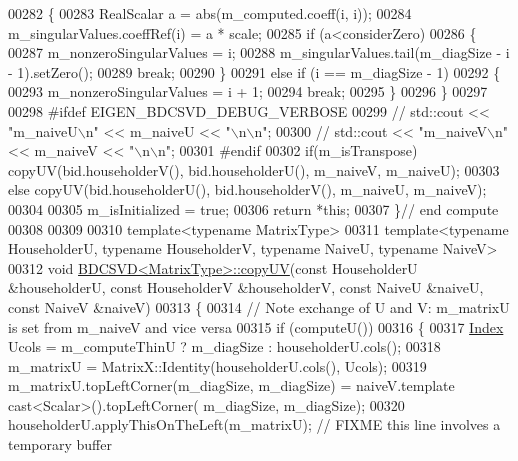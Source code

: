 \begin{DoxyCode}
00282   \{
00283     RealScalar a = abs(m\_computed.coeff(i, i));
00284     m\_singularValues.coeffRef(i) = a * scale;
00285     \textcolor{keywordflow}{if} (a<considerZero)
00286     \{
00287       m\_nonzeroSingularValues = i;
00288       m\_singularValues.tail(m\_diagSize - i - 1).setZero();
00289       \textcolor{keywordflow}{break};
00290     \}
00291     \textcolor{keywordflow}{else} \textcolor{keywordflow}{if} (i == m\_diagSize - 1)
00292     \{
00293       m\_nonzeroSingularValues = i + 1;
00294       \textcolor{keywordflow}{break};
00295     \}
00296   \}
00297 
00298 \textcolor{preprocessor}{#ifdef EIGEN\_BDCSVD\_DEBUG\_VERBOSE}
00299 \textcolor{comment}{//   std::cout << "m\_naiveU\(\backslash\)n" << m\_naiveU << "\(\backslash\)n\(\backslash\)n";}
00300 \textcolor{comment}{//   std::cout << "m\_naiveV\(\backslash\)n" << m\_naiveV << "\(\backslash\)n\(\backslash\)n";}
00301 \textcolor{preprocessor}{#endif}
00302   \textcolor{keywordflow}{if}(m\_isTranspose) copyUV(bid.householderV(), bid.householderU(), m\_naiveV, m\_naiveU);
00303   \textcolor{keywordflow}{else}              copyUV(bid.householderU(), bid.householderV(), m\_naiveU, m\_naiveV);
00304 
00305   m\_isInitialized = \textcolor{keyword}{true};
00306   \textcolor{keywordflow}{return} *\textcolor{keyword}{this};
00307 \}\textcolor{comment}{// end compute}
00308 
00309 
00310 \textcolor{keyword}{template}<\textcolor{keyword}{typename} MatrixType>
00311 \textcolor{keyword}{template}<\textcolor{keyword}{typename} HouseholderU, \textcolor{keyword}{typename} HouseholderV, \textcolor{keyword}{typename} NaiveU, \textcolor{keyword}{typename} NaiveV>
00312 \textcolor{keywordtype}{void} \hyperlink{group___s_v_d___module_class_eigen_1_1_b_d_c_s_v_d}{BDCSVD<MatrixType>::copyUV}(\textcolor{keyword}{const} HouseholderU &householderU, \textcolor{keyword}{const} 
      HouseholderV &householderV, \textcolor{keyword}{const} NaiveU &naiveU, \textcolor{keyword}{const} NaiveV &naiveV)
00313 \{
00314   \textcolor{comment}{// Note exchange of U and V: m\_matrixU is set from m\_naiveV and vice versa}
00315   \textcolor{keywordflow}{if} (computeU())
00316   \{
00317     \hyperlink{namespace_eigen_a62e77e0933482dafde8fe197d9a2cfde}{Index} Ucols = m\_computeThinU ? m\_diagSize : householderU.cols();
00318     m\_matrixU = MatrixX::Identity(householderU.cols(), Ucols);
00319     m\_matrixU.topLeftCorner(m\_diagSize, m\_diagSize) = naiveV.template cast<Scalar>().topLeftCorner(
      m\_diagSize, m\_diagSize);
00320     householderU.applyThisOnTheLeft(m\_matrixU); \textcolor{comment}{// FIXME this line involves a temporary buffer}

\end{DoxyCode}
